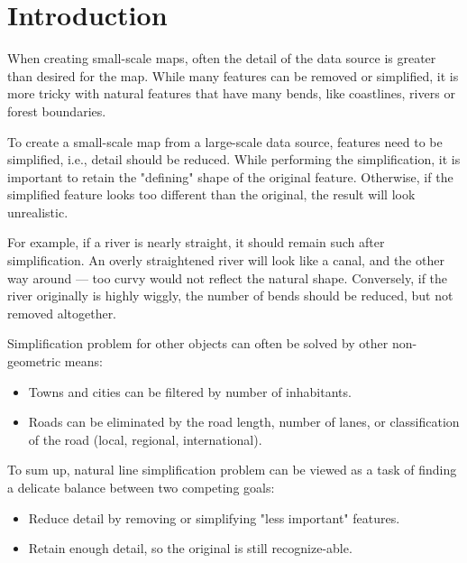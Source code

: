 \documentclass[a4paper]{article}
\begin{document}
\newpage

\section{Introduction}
\label{sec:introduction}

When creating small-scale maps, often the detail of the data source is greater
than desired for the map. While many features can be removed or simplified, it
is more tricky with natural features that have many bends, like coastlines,
rivers or forest boundaries.

To create a small-scale map from a large-scale data source, features need to be
simplified, i.e., detail should be reduced. While performing the
simplification, it is important to retain the "defining" shape of the original
feature. Otherwise, if the simplified feature looks too different than the
original, the result will look unrealistic.

For example, if a river is nearly straight, it should remain such after
simplification. An overly straightened river will look like a canal, and the
other way around --- too curvy would not reflect the natural shape. Conversely,
if the river originally is highly wiggly, the number of bends should be
reduced, but not removed altogether.

Simplification problem for other objects can often be solved by other
non-geometric means:

\begin{itemize}
    \item Towns and cities can be filtered by number of inhabitants.
    \item Roads can be eliminated by the road length, number of lanes, or
        classification of the road (local, regional, international).
\end{itemize}

To sum up, natural line simplification problem can be viewed as a task of
finding a delicate balance between two competing goals:

\begin{itemize}
    \item Reduce detail by removing or simplifying "less important" features.
    \item Retain enough detail, so the original is still recognize-able.
\end{itemize}
\end{document}
